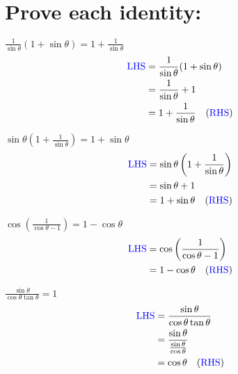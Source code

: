 \documentclass{article}
\begin{document}
\section{Prove each identity:}
\begin{multienum}
    \item $\frac{1}{\sin \theta}(1+ \sin \theta)=1+\frac{1}{\sin \theta}$
    \begin{align*}
        \text{\textcolor{blue}{LHS}} &= \frac{1}{\sin \theta}(1+ \sin \theta) \\
        &= \frac{1}{\sin \theta} + 1 \\
        &= 1 + \frac{1}{\sin \theta} \quad (\text{\textcolor{blue}{RHS}})
    \end{align*}

    \item $\sin \theta \left( 1+ \frac{1}{\sin \theta }\right)=1+ \sin \theta$
    \begin{align*}
        \text{\textcolor{blue}{LHS}} &= \sin \theta \left( 1+ \frac{1}{\sin \theta }\right) \\
        &= \sin \theta + 1 \\
        &= 1 + \sin \theta \quad (\text{\textcolor{blue}{RHS}})
    \end{align*}

    \item $\cos \left( \frac{1}{\cos \theta -1}\right)=1- \cos \theta$
    \begin{align*}
        \text{\textcolor{blue}{LHS}} &= \cos \left( \frac{1}{\cos \theta -1}\right) \\
        &= 1 - \cos \theta \quad (\text{\textcolor{blue}{RHS}})
    \end{align*}

    \item $\frac{\sin \theta }{\cos \theta \tan \theta} = 1$
    \begin{align*}
        \text{\textcolor{blue}{LHS}} &= \frac{\sin \theta }{\cos \theta \tan \theta} \\
        &= \frac{\sin \theta }{\frac{\sin \theta }{\cos \theta}} \\
        &= \cos \theta \quad (\text{\textcolor{blue}{RHS}})
    \end{align*}
\end{multienum}
\newpage 
\end{document}
